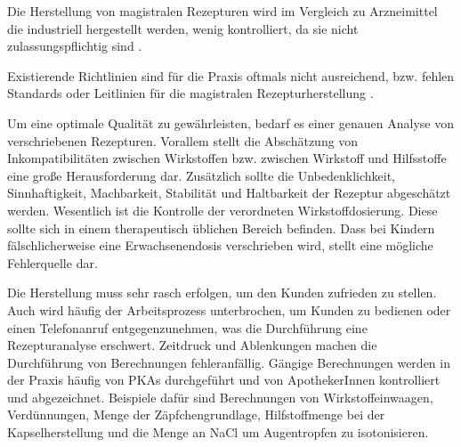 \documentclass[12pt,a4paper]{article}
\begin{document}



Die Herstellung von magistralen Rezepturen wird im Vergleich zu Arzneimittel die industriell hergestellt werden, wenig kontrolliert, da sie nicht zulassungspflichtig sind \cite{Holzer.2019}.%

Existierende Richtlinien sind für die Praxis oftmals nicht ausreichend,  %
bzw. fehlen Standards oder Leitlinien für die magistralen Rezepturherstellung \cite{.11.11.2019,Holzer.2019}.%

Um eine optimale  Qualität zu gewährleisten,  bedarf es einer genauen Analyse von verschriebenen Rezepturen. Vorallem stellt die Abschätzung von Inkompatibilitäten zwischen Wirkstoffen bzw. zwischen Wirkstoff und Hilfsstoffe eine große Herausforderung dar. Zusätzlich sollte die Unbedenklichkeit, Sinnhaftigkeit, Machbarkeit, Stabilität und Haltbarkeit der Rezeptur abgeschätzt werden. 
Wesentlich ist die Kontrolle der verordneten Wirkstoffdosierung. Diese sollte sich in einem therapeutisch üblichen Bereich befinden. Dass bei Kindern fälschlicherweise eine Erwachsenendosis verschrieben wird, stellt eine mögliche Fehlerquelle dar.

Die Herstellung muss sehr rasch erfolgen, um den Kunden zufrieden zu stellen. Auch wird häufig der Arbeitsprozess unterbrochen, um Kunden zu bedienen oder einen Telefonanruf entgegenzunehmen, was die Durchführung eine Rezepturanalyse erschwert. Zeitdruck und Ablenkungen machen die Durchführung von Berechnungen fehleranfällig. Gängige Berechnungen werden in der Praxis häufig von \ac{PKAs} durchgeführt und von ApothekerInnen kontrolliert und abgezeichnet. Beispiele dafür sind Berechnungen von Wirkstoffeinwaagen, Verdünnungen, Menge der Zäpfchengrundlage, Hilfstoffmenge bei der Kapselherstellung und die Menge an \ac{NaCl} um Augentropfen zu isotonisieren.
\end{document}
